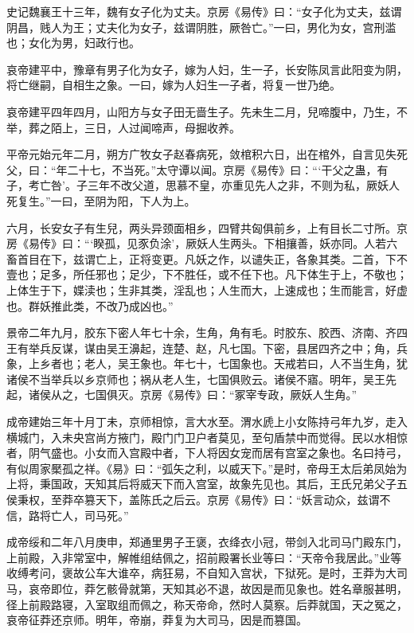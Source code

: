 \documentclass[12pt,UTF8]{ctexbook}
\begin{document}
史记魏襄王十三年，魏有女子化为丈夫。京房《易传》曰：“女子化为丈夫，兹谓阴昌，贱人为王；丈夫化为女子，兹谓阴胜，厥咎亡。”一曰，男化为女，宫刑滥也；女化为男，妇政行也。



哀帝建平中，豫章有男子化为女子，嫁为人妇，生一子，长安陈凤言此阳变为阴，将亡继嗣，自相生之象。一曰，嫁为人妇生一子者，将复一世乃绝。



哀帝建平四年四月，山阳方与女子田无啬生子。先未生二月，兒啼腹中，乃生，不举，葬之陌上，三日，人过闻啼声，母掘收养。



平帝元始元年二月，朔方广牧女子赵春病死，敛棺积六日，出在棺外，自言见失死父，曰：“年二十七，不当死。”太守谭以闻。京房《易传》曰：“‘干父之蛊，有子，考亡咎’。子三年不改父道，思慕不皇，亦重见先人之非，不则为私，厥妖人死复生。”一曰，至阴为阳，下人为上。



六月，长安女子有生兒，两头异颈面相乡，四臂共匈俱前乡，上有目长二寸所。京房《易传》曰：“‘睽孤，见豕负涂’，厥妖人生两头。下相攘善，妖亦同。人若六畜首目在下，兹谓亡上，正将变更。凡妖之作，以谴失正，各象其类。二首，下不壹也；足多，所任邪也；足少，下不胜任，或不任下也。凡下体生于上，不敬也；上体生于下，媟渎也；生非其类，淫乱也；人生而大，上速成也；生而能言，好虚也。群妖推此类，不改乃成凶也。”



景帝二年九月，胶东下密人年七十余，生角，角有毛。时胶东、胶西、济南、齐四王有举兵反谋，谋由吴王濞起，连楚、赵，凡七国。下密，县居四齐之中；角，兵象，上乡者也；老人，吴王象也。年七十，七国象也。天戒若曰，人不当生角，犹诸侯不当举兵以乡京师也；祸从老人生，七国俱败云。诸侯不寤。明年，吴王先起，诸侯从之，七国俱灭。京房《易传》曰：“冢宰专政，厥妖人生角。”



成帝建始三年十月丁未，京师相惊，言大水至。渭水虒上小女陈持弓年九岁，走入横城门，入未央宫尚方掖门，殿门门卫户者莫见，至句盾禁中而觉得。民以水相惊者，阴气盛也。小女而入宫殿中者，下人将因女宠而居有宫室之象也。名曰持弓，有似周家檿孤之祥。《易》曰：“弧矢之利，以威天下。”是时，帝母王太后弟凤始为上将，秉国政，天知其后将威天下而入宫室，故象先见也。其后，王氏兄弟父子五侯秉权，至莽卒篡天下，盖陈氏之后云。京房《易传》曰：“妖言动众，兹谓不信，路将亡人，司马死。”



成帝绥和二年八月庚申，郑通里男子王褒，衣绛衣小冠，带剑入北司马门殿东门，上前殿，入非常室中，解帷组结佩之，招前殿署长业等曰：“天帝令我居此。”业等收缚考问，褒故公车大谁卒，病狂易，不自知入宫状，下狱死。是时，王莽为大司马，哀帝即位，莽乞骸骨就第，天知其必不退，故因是而见象也。姓名章服甚明，径上前殿路寝，入室取组而佩之，称天帝命，然时人莫察。后莽就国，天之冤之，哀帝征莽还京师。明年，帝崩，莽复为大司马，因是而篡国。
\end{document}
